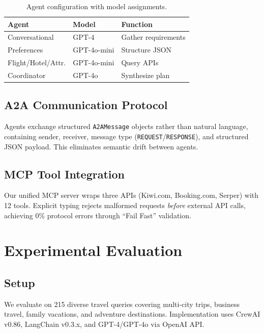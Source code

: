 \documentclass[conference]{IEEEtran}
\begin{document}
\begin{table}[h]
\centering
\small
\begin{tabular}{lll}
\toprule
\textbf{Agent} & \textbf{Model} & \textbf{Function} \\
\midrule
Conversational & GPT-4 & Gather requirements \\
Preferences & GPT-4o-mini & Structure JSON \\
Flight/Hotel/Attr. & GPT-4o-mini & Query APIs \\
Coordinator & GPT-4o & Synthesize plan \\
\bottomrule
\end{tabular}
\caption{Agent configuration with model assignments.}
\label{tab:agents}
\end{table}

\subsection{A2A Communication Protocol}

Agents exchange structured \texttt{A2AMessage} objects rather than natural language, containing sender, receiver, message type (\texttt{REQUEST}/\texttt{RESPONSE}), and structured JSON payload. This eliminates semantic drift between agents.

\subsection{MCP Tool Integration}

Our unified MCP server wraps three APIs (Kiwi.com, Booking.com, Serper) with 12 tools. Explicit typing rejects malformed requests \textit{before} external API calls, achieving 0\% protocol errors through ``Fail Fast'' validation.

\section{Experimental Evaluation}

\subsection{Setup}

We evaluate on 215 diverse travel queries covering multi-city trips, business travel, family vacations, and adventure destinations. Implementation uses CrewAI v0.86, LangChain v0.3.x, and GPT-4/GPT-4o via OpenAI API.
\end{document}
